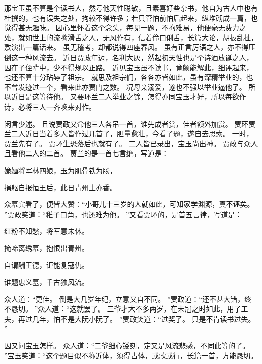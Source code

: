 那宝玉虽不算是个读书人，然亏他天性聪敏，且素喜好些杂书，他自为古人中也有杜撰的，也有误失之处，拘较不得许多；若只管怕前怕后起来，纵堆砌成一篇，也觉得甚无趣味。
因心里怀着这个念头，每见一题，不拘难易，他便毫无费力之处，就如世上的流嘴滑舌之人，无风作有，信着伶口俐舌，长篇大论，胡扳乱扯，敷演出一篇话来。
虽无稽考，却都说得四座春风。
虽有正言厉语之人，亦不得压倒这一种风流去。
近日贾政年迈，名利大灰，然起初天性也是个诗酒放诞之人，因在子侄辈中，少不得规以正路。
近见宝玉虽不读书，竟颇能解此，细评起来，也还不算十分玷辱了祖宗。
就思及祖宗们，各各亦皆如此，虽有深精举业的，也不曾发迹过一个，看来此亦贾门之数。
况母亲溺爱，遂也不强以举业逼他了。
所以近日是这等待他。
又要环兰二人举业之馀，怎得亦同宝玉才好，所以每欲作诗，必将三人一齐唤来对作。
\par
闲言少述。
且说贾政又命他三人各吊一首，谁先成者赏，佳者额外加赏。
贾环贾兰二人近日当着多人皆作过几首了，胆量愈壮，今看了题，遂自去思索。
一时，贾兰先有了。
贾环生恐落后也就有了。
二人皆已录出，宝玉尚出神。
贾政与众人且看他二人的二首。
贾兰的是一首七言绝，写道是：\par
\hop
姽婳将军林四娘，玉为肌骨铁为肠，\par
捐躯自报恒王后，此日青州土亦香。
\par
\hop
众幕宾看了，便皆大赞：“小哥儿十三岁的人就如此，可知家学渊源，真不诬矣。
”贾政笑道：“稚子口角，也还难为他。
”又看贾环的，是首五言律，写道是：\par
\hop
红粉不知愁，将军意未休。
\par
掩啼离绣幕，抱恨出青州。
\par
自谓酬王德，讵能复寇仇。
\par
谁题忠义墓，千古独风流。
\par
\hop
众人道：“更佳。
倒是大几岁年纪，立意又自不同。
”贾政道：“还不甚大错，终不恳切。
”众人道：“这就罢了。
三爷才大不多两岁，在未冠之时如此，用了工夫，再过几年，怕不是大阮小阮了。
”贾政笑道：“过奖了。
只是不肯读书过失。
”\par
因又问宝玉怎样。
众人道：“二爷细心镂刻，定又是风流悲感，不同此等的了。
”宝玉笑道：“这个题目似不称近体，须得古体，或歌或行，长篇一首，方能恳切。
